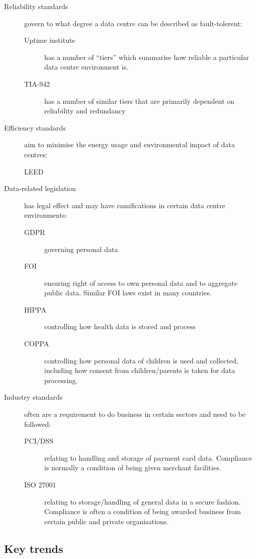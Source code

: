 \documentclass{pgnotes}
\begin{document}
\begin{description}
\item[Reliability standards] govern to what degree a data centre can be described as fault-tolerent:
  \begin{description}
  \item[Uptime institute] has a number of ``tiers'' which summarise how reliable a particular data centre environment is.
  \item[TIA-942] has a number of similar tiers that are primarily dependent on reliability and redundancy
  \end{description}
\item[Efficiency standards] aim to minimise the energy usage and environmental impact of data centres:
\begin{description}
\item[LEED]
\end{description}
\item[Data-related legislation] has legal effect and may have ramifications in certain data centre environments:
  \begin{description}
  \item[GDPR] governing personal data
  \item[FOI] ensuring right of access to own personal data and to aggregate public data. Similar FOI laws exist in many countries.
  \item[HIPPA] controlling how health data is stored and process
  \item[COPPA] controlling how personal data of children is used and collected, including how consent from children/parents is taken for data processing.
  \end{description}
\item[Industry standards] often are a requirement to do business in certain sectors and need to be followed:
  \begin{description}
  \item[PCI/DSS] relating to handling and storage of payment card data. Compliance is normally a condition of being given merchant facilities.
  \item[ISO 27001] relating to storage/handling of general data in a secure fashion.  Compliance is often a condition of being awarded business from certain public and private organisations.
  \end{description}
\end{description}


\subsection{Key trends}
\end{document}
